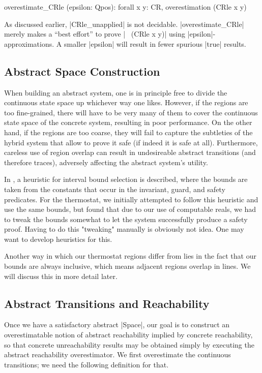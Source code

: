 \documentclass[runningheads]{llncs}
\begin{document}

\begin{code}
overestimate_CRle (epsilon: Qpos): forall x y: CR, overestimation (CRle x y)
\end{code}
As discussed earlier, |CRle_unapplied| is not
decidable. |overestimate_CRle| merely makes a ``best effort'' to prove
|~ (CRle x y)| using |epsilon|-approximations. A smaller |epsilon|
will result in fewer spurious |true| results.




\subsection{Abstract Space Construction}
\label{abs.space.constr}

When building an abstract system, one is in principle free to divide
the continuous state space up whichever way one likes. However, if the
regions are too fine-grained, there will have to be very many of them
to cover the continuous state space of the concrete system, resulting
in poor performance. On the other hand, if the regions are too coarse,
they will fail to capture the subtleties of the hybrid system that
allow to prove it safe (if indeed it is safe at all).  Furthermore,
careless use of region overlap can result in undesireable abstract
transitions (and therefore traces), adversely affecting the abstract
system's utility.

In \cite{alur}, a heuristic for interval bound selection is described,
where the bounds are taken from the constants that occur in the
invariant, guard, and safety predicates. For the thermostat, we
initially attempted to follow this heuristic and use the same bounds,
but found that due to our use of computable reals, we had to tweak the
bounds somewhat to let the system successfully produce a safety
proof. 
Having to do this "tweaking" manually is obviously not idea. One may want to develop heuristics for this. 


Another way in which our thermostat regions differ from \cite{alur}
lies in the fact that our bounds are always inclusive, which means
adjacent regions overlap in lines. We will discuss this in more detail
later.

\subsection{Abstract Transitions and Reachability}
\label{abs.reach}
Once we have a satisfactory abstract |Space|, our goal is to construct
an overestimatable notion of abstract reachability implied by concrete
reachability, so that concrete unreachability results may be obtained
simply by executing the abstract reachability overestimator. We first overestimate the continuous transitions; we need the following definition for that.
\end{document}
